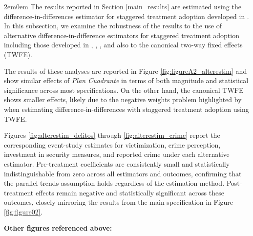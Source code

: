 \begin{adjustwidth}{2em}{0em}
The results reported in Section \ref{main_results} are estimated using the difference-in-differences estimator for staggered treatment adoption developed in \citet{Callaway}. In this subsection, we examine the robustness of the results to the use of alternative difference-in-difference estimators for staggered treatment adoption including those developed in \citet{Chaisemartin}, \citet{Gardner}, \citet{wooldridge2023simple}, and also to the canonical two-way fixed effects (TWFE).

The results of these analyses are reported in Figure \ref{fig:figureA2_alterestim} and show similar effects of \emph{Plan Cuadrante} in terms of both magnitude and statistical significance across most specifications. On the other hand, the canonical TWFE shows smaller effects, likely due to the negative weights problem highlighted by \citet{GoodmanBacon} when estimating difference-in-differences with staggered treatment adoption using TWFE.

Figures \ref{fig:alterestim_delitos} through \ref{fig:alterestim_crime} report the corresponding event-study estimates for victimization, crime perception, investment in security measures, and reported crime under each alternative estimator. Pre-treatment coefficients are consistently small and statistically indistinguishable from zero across all estimators and outcomes, confirming that the parallel trends assumption holds regardless of the estimation method. Post-treatment effects remain negative and statistically significant across these outcomes, closely mirroring the results from the main specification in Figure \ref{fig:figure02}.
\end{adjustwidth}

\clearpage
\noindent\textbf{Other figures referenced above:}
\vspace{0.5em}

{\renewcommand{\thefigure}{C.2}
}

\clearpage

{\setcounter{figure}{2}\renewcommand{\thefigure}{C.\arabic{figure}}
}

\clearpage
